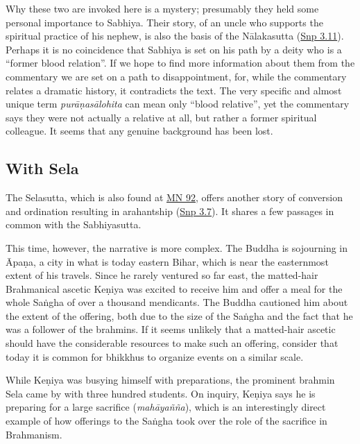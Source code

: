 \documentclass[12pt,openany]{book}%
\begin{document}
Why these two are invoked here is a mystery; presumably they held some personal importance to Sabhiya. Their story, of an uncle who supports the spiritual practice of his nephew, is also the basis of the \textsanskrit{Nālakasutta} (\href{https://suttacentral.net/snp3.11}{Snp 3.11}). Perhaps it is no coincidence that Sabhiya is set on his path by a deity who is a “former blood relation”. If we hope to find more information about them from the commentary we are set on a path to disappointment, for, while the commentary relates a dramatic history, it contradicts the text. The very specific and almost unique term \textit{\textsanskrit{purāṇasālohita}} can mean only “blood relative”, yet the commentary says they were not actually a relative at all, but rather a former spiritual colleague. It seems that any genuine background has been lost. 

\subsection*{With Sela}

The Selasutta, which is also found at \href{https://suttacentral.net/mn92/en/sujato}{MN 92}, offers another story of conversion and ordination resulting in arahantship (\href{https://suttacentral.net/snp3.7/en/sujato}{Snp 3.7}). It shares a few passages in common with the Sabhiyasutta.

This time, however, the narrative is more complex. The Buddha is sojourning in \textsanskrit{Āpaṇa}, a city in what is today eastern Bihar, which is near the easternmost extent of his travels. Since he rarely ventured so far east, the matted-hair Brahmanical ascetic \textsanskrit{Keṇiya} was excited to receive him and offer a meal for the whole \textsanskrit{Saṅgha} of over a thousand mendicants. The Buddha cautioned him about the extent of the offering, both due to the size of the \textsanskrit{Saṅgha} and the fact that he was a follower of the brahmins. If it seems unlikely that a matted-hair ascetic should have the considerable resources to make such an offering, consider that today it is common for bhikkhus to organize events on a similar scale.

While \textsanskrit{Keṇiya} was busying himself with preparations, the prominent brahmin Sela came by with three hundred students. On inquiry, \textsanskrit{Keṇiya} says he is preparing for a large sacrifice (\textit{\textsanskrit{mahāyañña}}), which is an interestingly direct example of how offerings to the \textsanskrit{Saṅgha} took over the role of the sacrifice in Brahmanism.
\end{document}
